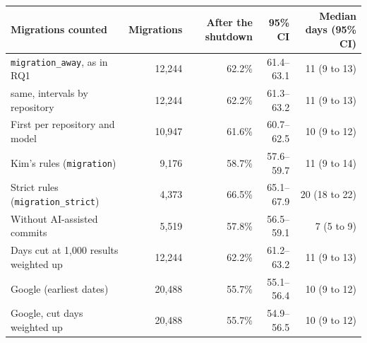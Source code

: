 \begin{tabular}{lrrrr}
\toprule
Migrations counted & Migrations & After the shutdown & 95\% CI & Median days (95\% CI) \\
\midrule
\texttt{migration\_away}, as in RQ1 & 12,244 & 62.2\% & 61.4--63.1 & 11 (9 to 13) \\
same, intervals by repository & 12,244 & 62.2\% & 61.3--63.2 & 11 (9 to 13) \\
First per repository and model & 10,947 & 61.6\% & 60.7--62.5 & 10 (9 to 12) \\
Kim's rules (\texttt{migration}) & 9,176 & 58.7\% & 57.6--59.7 & 11 (9 to 14) \\
Strict rules (\texttt{migration\_strict}) & 4,373 & 66.5\% & 65.1--67.9 & 20 (18 to 22) \\
Without AI-assisted commits & 5,519 & 57.8\% & 56.5--59.1 & 7 (5 to 9) \\
Days cut at 1,000 results weighted up & 12,244 & 62.2\% & 61.2--63.2 & 11 (9 to 13) \\
\midrule
Google (earliest dates) & 20,488 & 55.7\% & 55.1--56.4 & 10 (9 to 12) \\
Google, cut days weighted up & 20,488 & 55.7\% & 54.9--56.5 & 10 (9 to 12) \\
\bottomrule
\end{tabular}
